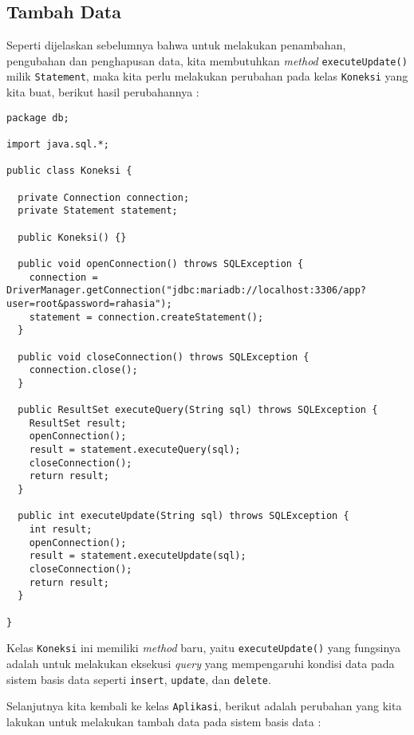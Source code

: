 \subsection{Tambah Data}

Seperti dijelaskan sebelumnya bahwa untuk melakukan penambahan, pengubahan dan penghapusan data, kita membutuhkan \textit{method} \texttt{executeUpdate()} milik \texttt{Statement}, maka kita perlu melakukan perubahan pada kelas \texttt{Koneksi} yang kita buat, berikut hasil perubahannya :

\begin{lstlisting}
package db;

import java.sql.*;

public class Koneksi {
  
  private Connection connection;
  private Statement statement;
  
  public Koneksi() {}  
  
  public void openConnection() throws SQLException {
    connection = DriverManager.getConnection("jdbc:mariadb://localhost:3306/app?user=root&password=rahasia");
    statement = connection.createStatement();
  }
  
  public void closeConnection() throws SQLException {
    connection.close();
  }
  
  public ResultSet executeQuery(String sql) throws SQLException {
    ResultSet result;
    openConnection();
    result = statement.executeQuery(sql);
    closeConnection();
    return result;
  }
  
  public int executeUpdate(String sql) throws SQLException {
    int result;
    openConnection();
    result = statement.executeUpdate(sql);
    closeConnection();
    return result;
  }
  
}
\end{lstlisting}

Kelas \texttt{Koneksi} ini memiliki \textit{method} baru, yaitu \texttt{executeUpdate()} yang fungsinya adalah untuk melakukan eksekusi \textit{query} yang mempengaruhi kondisi data pada sistem basis data seperti \texttt{insert}, \texttt{update}, dan \texttt{delete}.

Selanjutnya kita kembali ke kelas \texttt{Aplikasi}, berikut adalah perubahan yang kita lakukan untuk melakukan tambah data pada sistem basis data :

